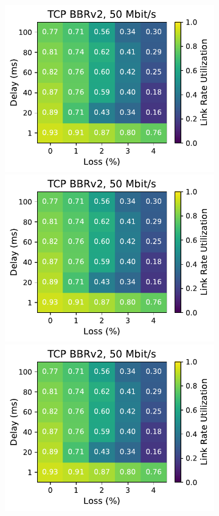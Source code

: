 \begin{figure}[ht]
\begin{subfigure}[b]{0.89cm}
        \includegraphics[width=\linewidth,trim={8cm 0 0 0},clip]{splitting/figures/heatmaps/heatmap_tcp_bbr2_50mbps.pdf}
        \includegraphics[width=\linewidth,trim={8cm 0 0 0},clip]{splitting/figures/heatmaps/heatmap_tcp_bbr2_50mbps.pdf}
        \includegraphics[width=\linewidth,trim={8cm 0 0 0},clip]{splitting/figures/heatmaps/heatmap_tcp_bbr2_50mbps.pdf}

\end{subfigure}
\end{figure}
